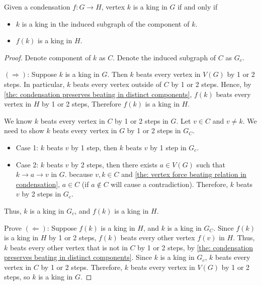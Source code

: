 \begin{corollary}\label{the: condensation preserves king}
  Given a condensation \(f: G \to H\),
  vertex \(k\) is a king in \(G\) if and only if
  \begin{itemize}
    \item \(k\) is a king in the
      induced subgraph of the component of \(k\).
    \item \(f(k)\) is a king in \(H\).
  \end{itemize}
\end{corollary}

\begin{proof}
  Denote component of \(k\) as \(C\).
  Denote the induced subgraph of \(C\) as \(G_c\).

  \((\Rightarrow )\):
  Suppose \(k\) is a king in \(G\).
  Then \(k\) beats every vertex in \(V(G)\) by 1 or 2 steps.
  In particular, \(k\) beats every vertex outside of \(C\) by
  1 or 2 steps.
  Hence, by \cref{the: condensation preserves beating in distinct components},
  \(f(k)\) beats every vertex in \(H\) by 1 or 2 steps,
  Therefore \(f(k)\) is a king in \(H\).

  We know \(k\) beats every vertex in \(C\) by 1 or 2 steps in \(G\).
  Let \(v \in C\) and \(v \neq k\).
  We need to show \(k\) beats every vertex in \(G\) by 1 or 2 steps in \(G_C\).
  \begin{itemize}
    \item Case 1: \(k\) beats \(v\) by 1 step, then
      \(k\) beats \(v\) by 1 step in \(G_c\).
    \item Case 2: \(k\) beats \(v\) by 2 steps, then
      there exists \(a \in V(G)\) such that \(k \to a \to v\) in \(G\).
      because \(v, k \in C\) and
      \cref{the: vertex force beating relation in condensation},
      \(a \in C\) (if \(a \notin C\) will cause a contradiction).
      Therefore, \(k\) beats \(v\) by 2 steps in \(G_c\).
  \end{itemize}
  Thus, \(k\) is a king in \(G_c\),
  and \(f(k)\) is a king in \(H\).

  Prove \((\Leftarrow )\):
  Suppose \(f(k)\) is a king in \(H\),
  and \(k\) is a king in \(G_C\).
  Since \(f(k)\) is a king in \(H\) by 1 or 2 steps,
  \(f(k)\) beats every other vertex \(f(v)\) in \(H\).
  Thus, \(k\) beats every other vertex that is not in \(C\)
  by 1 or 2 steps, by \cref{the: condensation preserves beating in distinct components}.
  Since \(k\) is a king in \(G_c\),
  \(k\) beats every vertex in \(C\) by 1 or 2 steps.
  Therefore, \(k\) beats every vertex in \(V(G)\) by 1 or 2 steps,
  so \(k\) is a king in \(G\).
\end{proof}

